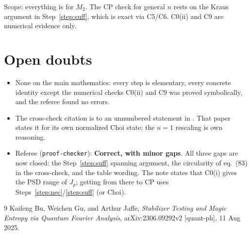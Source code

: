 \documentclass[11pt]{article}
\begin{document}
Scope: everything is for $M_2$. The CP check for general $n$ rests on the Kraus argument in
Step~\ref{step:suff}, which is exact via C5/C6. C0(ii) and C9 are numerical evidence only.

\section*{Open doubts}
\begin{itemize}
  \item None on the main mathematics: every step is elementary, every concrete identity except
    the numerical checks C0(ii) and C9 was proved symbolically, and the referee found no errors.
  \item The cross-check citation is to an unnumbered statement in
    \cite[p.~25 (PDF page)]{bu-gu-jaffe-magic}. That paper states it for its own normalized Choi
    state; the $n=1$ rescaling is own reasoning.
  \item Referee (\texttt{proof-checker}): \textbf{Correct, with minor gaps}. All three gaps are
    now closed: the Step~\ref{step:suff} spanning argument, the circularity of eq.~(83) in the
    cross-check, and the table wording. The note states that C0(i) gives the PSD range of $J_p$;
    getting from there to CP uses Steps~\ref{step:nec}/\ref{step:suff} (or Choi).
\end{itemize}

\begin{thebibliography}{9}
 Kaifeng Bu, Weichen Gu, and Arthur Jaffe, \emph{Stabilizer Testing
  and Magic Entropy via Quantum Fourier Analysis}, arXiv:2306.09292v2 [quant-ph], 11 Aug 2025.
\end{thebibliography}
\end{document}

